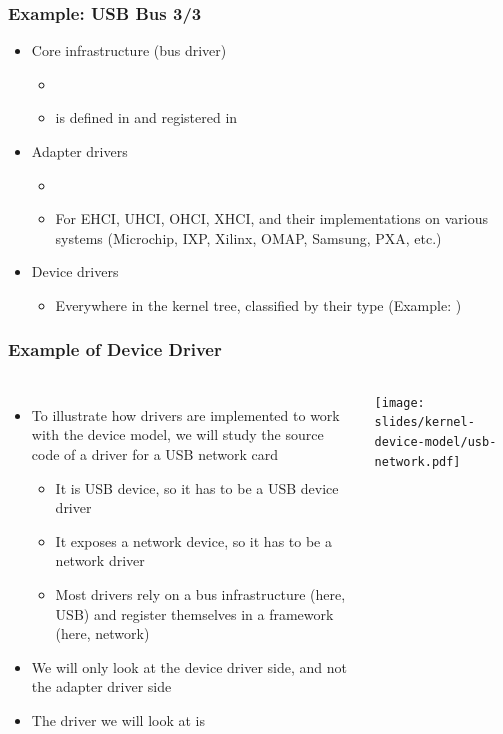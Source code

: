 \begin{frame}
  \frametitle{Example: USB Bus 3/3}
  \begin{itemize}
  \item Core infrastructure (bus driver)
    \begin{itemize}
    \item {}
    \item {} is defined in
       and registered in
    \end{itemize}
  \item Adapter drivers
    \begin{itemize}
    \item {}
    \item For EHCI, UHCI, OHCI, XHCI, and their implementations on
      various systems (Microchip, IXP, Xilinx, OMAP, Samsung, PXA, etc.)
    \end{itemize}
  \item Device drivers
    \begin{itemize}
    \item Everywhere in the kernel tree, classified by their type
    (Example: )
    \end{itemize}
  \end{itemize}
\end{frame}

\begin{frame}
  \frametitle{Example of Device Driver}
  \begin{columns}
  \begin{itemize}
  \item To illustrate how drivers are implemented to work with the
    device model, we will study the source code of a driver for a USB
    network card
    \begin{itemize}
    \item It is USB device, so it has to be a USB device driver
    \item It exposes a network device, so it has to be a network driver
    \item Most drivers rely on a bus infrastructure (here, USB) and
      register themselves in a framework (here, network)
    \end{itemize}
  \item We will only look at the device driver side, and not the
    adapter driver side
  \item The driver we will look at is 
  \end{itemize}
      \texttt{[image: slides/kernel-device-model/usb-network.pdf]}
  \end{columns}
\end{frame}

